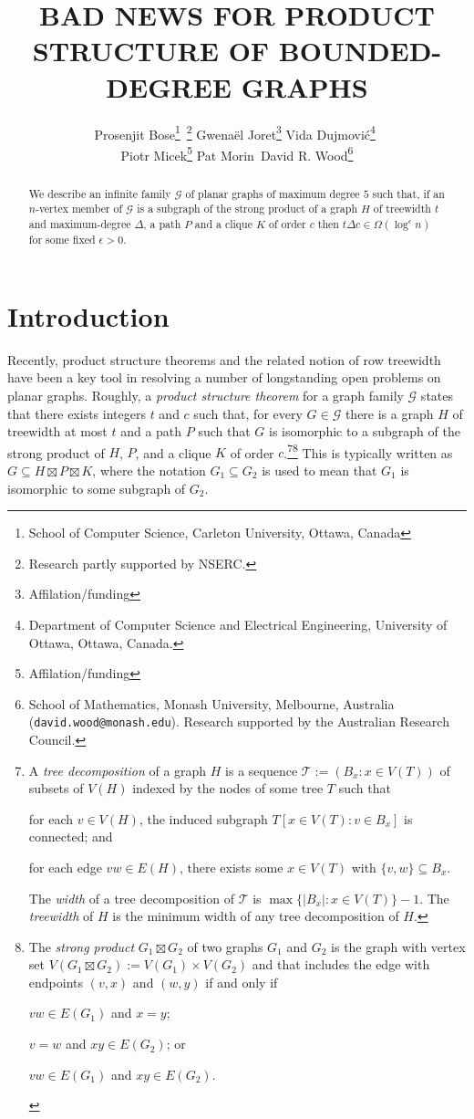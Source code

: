 \documentclass{patmorin}
\title{\MakeUppercase{Bad News for Product Structure of Bounded-Degree Graphs}}
\author{%
  Prosenjit Bose\thanks{School of Computer Science, Carleton University, Ottawa, Canada}\, \thanks{Research partly supported by NSERC.} \quad
  Gwenaël Joret\thanks{Affilation/funding} \quad 
  Vida Dujmović\thanks{Department of Computer Science and Electrical Engineering, University of Ottawa, Ottawa, Canada.}\,\, \footnotemark[2] \\[1ex]
  Piotr Micek\thanks{Affilation/funding}\quad
  Pat Morin\footnotemark[1]\, \footnotemark[2] \quad
  David R. Wood\thanks{School of Mathematics, Monash University, Melbourne, Australia (\texttt{david.wood@monash.edu}). Research supported by the Australian Research Council.}
}
\date{}
\newcommand{\defin}[1]{\emph{\color{brightmaroon}#1}}
\begin{document}
\maketitle
\renewcommand{\E}{\mathbb{E}}
\renewcommand{\Pr}{\mathbb{P}}

\begin{abstract}
  We describe an infinite family $\mathcal{G}$ of planar graphs of maximum degree $5$ such that, if an $n$-vertex member of $\mathcal{G}$ is a subgraph of the strong product of a graph $H$ of treewidth $t$ and maximum-degree $\Delta$, a path $P$ and a clique $K$ of order $c$ then $t\Delta c \in \Omega(\log^\epsilon n)$ for some fixed $\epsilon >0$.
\end{abstract}

\section{Introduction}

Recently, product structure theorems and the related notion of row treewidth have been a key tool in resolving a number of longstanding open problems on planar graphs.  Roughly, a \defin{product structure theorem} for a graph family $\mathcal{G}$ states that there exists integers $t$ and $c$ such that, for every $G\in\mathcal{G}$ there is a graph $H$ of treewidth at most $t$ and a path $P$ such that $G$ is isomorphic to a subgraph of the strong product of $H$, $P$, and a clique $K$ of order $c$.\footnote{A \defin{tree decomposition} of a graph $H$ is a sequence $\mathcal{T}:=(B_x:x\in V(T))$ of subsets of $V(H)$ indexed by the nodes of some tree $T$ such that
\begin{inparaenum}[(i)]
  \item for each $v\in V(H)$, the induced subgraph $T[x\in V(T):v\in B_x]$ is connected; and
  \item for each edge $vw\in E(H)$, there exists some $x\in V(T)$ with $\{v,w\}\subseteq B_x$.
\end{inparaenum}
The \defin{width} of a tree decomposition of $\mathcal{T}$ is $\max\{|B_x|:x\in V(T)\}-1$. The \defin{treewidth} of $H$ is the minimum width of any tree decomposition of $H$.}\footnote{The \defin{strong product} $G_1\boxtimes G_2$ of two graphs $G_1$ and $G_2$ is the graph with vertex set $V(G_1\boxtimes G_2):=V(G_1)\times V(G_2)$ and that includes the edge with endpoints $(v,x)$ and $(w,y)$ if and only if
\begin{inparaenum}[(i)]
  \item $vw\in E(G_1)$ and $x=y$;
  \item $v=w$ and $xy\in E(G_2)$; or
  \item $vw\in E(G_1)$ and $xy\in E(G_2)$.
\end{inparaenum}
}
This is typically written as $G\subseteq H\boxtimes P\boxtimes K$, where the notation $G_1\subseteq G_2$ is used to mean that $G_1$ is isomorphic to some subgraph of $G_2$.
\end{document}
